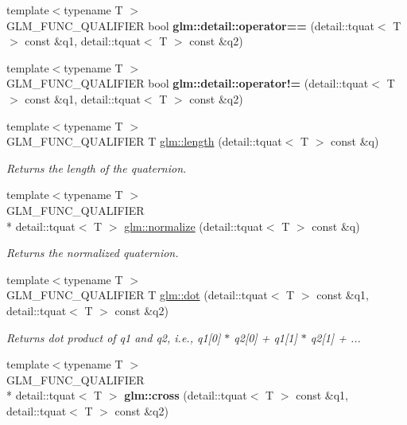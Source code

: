 \begin{DoxyCompactItemize}
\item 
\hypertarget{namespaceglm_1_1detail_a96329fbb8f896966d3c4d389ae2c9716}{{\footnotesize template$<$typename T $>$ }\\G\-L\-M\-\_\-\-F\-U\-N\-C\-\_\-\-Q\-U\-A\-L\-I\-F\-I\-E\-R bool {\bfseries glm\-::detail\-::operator==} (detail\-::tquat$<$ T $>$ const \&q1, detail\-::tquat$<$ T $>$ const \&q2)}\label{namespaceglm_1_1detail_a96329fbb8f896966d3c4d389ae2c9716}

\item 
\hypertarget{namespaceglm_1_1detail_aa7964957d37518ed89c2d08e2b33cd79}{{\footnotesize template$<$typename T $>$ }\\G\-L\-M\-\_\-\-F\-U\-N\-C\-\_\-\-Q\-U\-A\-L\-I\-F\-I\-E\-R bool {\bfseries glm\-::detail\-::operator!=} (detail\-::tquat$<$ T $>$ const \&q1, detail\-::tquat$<$ T $>$ const \&q2)}\label{namespaceglm_1_1detail_aa7964957d37518ed89c2d08e2b33cd79}

\item 
{\footnotesize template$<$typename T $>$ }\\G\-L\-M\-\_\-\-F\-U\-N\-C\-\_\-\-Q\-U\-A\-L\-I\-F\-I\-E\-R T \hyperlink{group__gtc__quaternion_ga60d5647f87c2c423497d0f3bf8c407b8}{glm\-::length} (detail\-::tquat$<$ T $>$ const \&q)
\begin{DoxyCompactList}\small\item\em Returns the length of the quaternion. \end{DoxyCompactList}\item 
{\footnotesize template$<$typename T $>$ }\\G\-L\-M\-\_\-\-F\-U\-N\-C\-\_\-\-Q\-U\-A\-L\-I\-F\-I\-E\-R \\*
detail\-::tquat$<$ T $>$ \hyperlink{group__gtc__quaternion_gabd269bb967469a6f1df5963455fee6be}{glm\-::normalize} (detail\-::tquat$<$ T $>$ const \&q)
\begin{DoxyCompactList}\small\item\em Returns the normalized quaternion. \end{DoxyCompactList}\item 
{\footnotesize template$<$typename T $>$ }\\G\-L\-M\-\_\-\-F\-U\-N\-C\-\_\-\-Q\-U\-A\-L\-I\-F\-I\-E\-R T \hyperlink{group__gtc__quaternion_gab9101d7f5b27ca682fc84e32b8fd70ad}{glm\-::dot} (detail\-::tquat$<$ T $>$ const \&q1, detail\-::tquat$<$ T $>$ const \&q2)
\begin{DoxyCompactList}\small\item\em Returns dot product of q1 and q2, i.\-e., q1\mbox{[}0\mbox{]} $\ast$ q2\mbox{[}0\mbox{]} + q1\mbox{[}1\mbox{]} $\ast$ q2\mbox{[}1\mbox{]} + ... \end{DoxyCompactList}\item 
\hypertarget{namespaceglm_aa097c896b3eae629723dd87304e3f061}{{\footnotesize template$<$typename T $>$ }\\G\-L\-M\-\_\-\-F\-U\-N\-C\-\_\-\-Q\-U\-A\-L\-I\-F\-I\-E\-R \\*
detail\-::tquat$<$ T $>$ {\bfseries glm\-::cross} (detail\-::tquat$<$ T $>$ const \&q1, detail\-::tquat$<$ T $>$ const \&q2)}\label{namespaceglm_aa097c896b3eae629723dd87304e3f061}


\end{DoxyCompactItemize}
